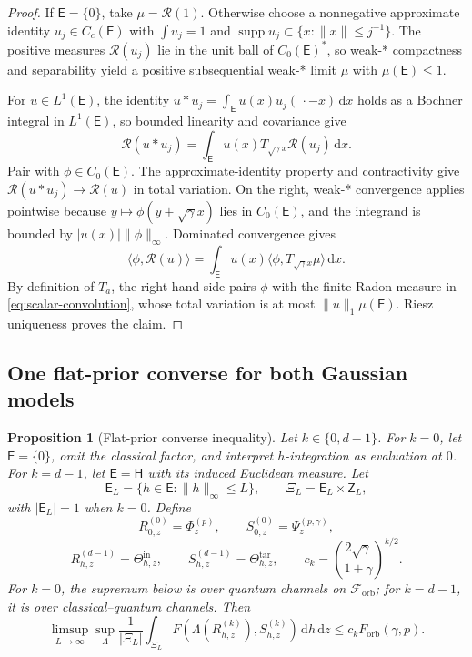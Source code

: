 \documentclass[11pt]{article}
\newtheorem{proposition}[proposition]{Proposition}
\theoremstyle{remark}
\theoremstyle{plain}
\newcommand{\cF}{\mathcal F}
\newcommand{\dd}{\mathrm d}
\newcommand{\Forb}{F_{\mathrm{orb}}}
\begin{document}
\begin{proof}
If \(\mathsf E=\{0\}\), take \(\mu=\mathcal R(1)\).  Otherwise choose a
nonnegative approximate identity \(u_j\in C_c(\mathsf E)\) with \(\int u_j=1\)
and \(\operatorname{supp}u_j\subset\{x:\|x\|\le j^{-1}\}\).  The positive
measures \(\mathcal R(u_j)\) lie in the unit ball of \(C_0(\mathsf E)^*\), so
weak-* compactness and separability yield a positive subsequential weak-* limit
\(\mu\) with \(\mu(\mathsf E)\le1\).

For \(u\in L^1(\mathsf E)\), the identity
\(u*u_j=\int_{\mathsf E}u(x)u_j(\,\cdot-x)\,\dd x\) holds as a Bochner
integral in \(L^1(\mathsf E)\), so bounded linearity and covariance give
\[
  \mathcal R(u*u_j)=\int_{\mathsf E}u(x)T_{\sqrt\gamma x}\mathcal R(u_j)\,\dd x.
\]
Pair with \(\phi\in C_0(\mathsf E)\).  The approximate-identity property and
contractivity give \(\mathcal R(u*u_j)\to\mathcal R(u)\) in total variation.
On the right, weak-* convergence applies pointwise because
\(y\mapsto\phi(y+\sqrt\gamma x)\) lies in \(C_0(\mathsf E)\), and the
integrand is bounded by \(|u(x)|\|\phi\|_\infty\).  Dominated convergence gives
\[
  \langle\phi,\mathcal R(u)\rangle=\int_{\mathsf E}u(x)\langle\phi,T_{\sqrt\gamma x}\mu\rangle\,\dd x.
\]
By definition of \(T_a\), the right-hand side pairs \(\phi\) with the finite
Radon measure in \eqref{eq:scalar-convolution}, whose total variation is at
most \(\|u\|_1\mu(\mathsf E)\).  Riesz uniqueness proves the claim.
\end{proof}

\subsection{One flat-prior converse for both Gaussian models}

\begin{proposition}[Flat-prior converse inequality]
\label{prop:flat-prior-converse}
Let \(k\in\{0,d-1\}\).  For \(k=0\), let
\(\mathsf E=\{0\}\), omit the classical factor, and interpret \(h\)-integration
as evaluation at \(0\).  For \(k=d-1\), let \(\mathsf E=\mathsf H\) with its
induced Euclidean measure.  Let
\[
  \mathsf E_L=\{h\in\mathsf E:\|h\|_\infty\le L\},
  \qquad
  \Xi_L=\mathsf E_L\times\mathsf Z_L,
\]
with \(|\mathsf E_L|=1\) when \(k=0\).  Define
\[
  R_{0,z}^{(0)}=\Phi_z^{(p)},
  \qquad S_{0,z}^{(0)}=\Psi_z^{(p,\gamma)},
\]
\[
  R_{h,z}^{(d-1)}=\Theta_{h,z}^{\mathrm{in}},
  \qquad S_{h,z}^{(d-1)}=\Theta_{h,z}^{\mathrm{tar}},
  \qquad
  c_k=\left(\frac{2\sqrt\gamma}{1+\gamma}\right)^{k/2}.
\]
For \(k=0\), the supremum below is over quantum channels on
\(\cF_{\mathrm{orb}}\); for \(k=d-1\), it is over classical--quantum
channels.  Then
\begin{equation}\label{eq:unified-flat-prior-converse}
  \limsup_{L\to\infty}\sup_\Lambda
  \frac1{|\Xi_L|}\int_{\Xi_L}
  F\!\left(\Lambda(R_{h,z}^{(k)}),S_{h,z}^{(k)}\right)
  \,\dd h\,\dd z
  \le c_k\Forb(\gamma,p).
\end{equation}
\end{proposition}
\end{document}
